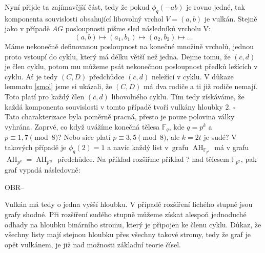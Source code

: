 \documentclass[12pt]{report}
\DeclareMathOperator{\AH}{AH}
\begin{document}


Nyní přijde ta zajímavější část, tedy že pokud $\phi_q(-ab)$ je rovno jedné, tak komponenta souvislosti obsahující libovolný vrchol $V=(a,b)$ je vulkán. Stejně jako v případě $AG$ posloupnosti pišme sled následníků vrcholu V:
$$(a,b)\longmapsto (a_1,b_1)\longmapsto (a_2, b_2) \longmapsto \dots$$
Máme nekonečně definovanou posloupnost na konečné množině vrcholů, jednou proto vstoupí do cyklu, který má délku větší než jedna. Dejme tomu, že $(c,d)$ je člen cyklu, potom mu můžeme psát nekonečnou posloupnost předků ležících v cyklu. Ať je tedy $(C,D)$ předchůdce $(c,d)$ neležící v cyklu.  V důkaze lemmatu \ref{smol} jsme si ukázali, že $(C,D)$ má dva rodiče a ti již rodiče nemají. Toto platí pro každý člen $(c,d)$ libovolného cyklu. Tím tedy získáváme, že každá komponenta souvislosti v tomto případě tvoří vulkány hloubky $2$. \hfill $\square$\\
 

Tato charakterizace byla poměrně pracná, přesto je pouze polovina války vyhrána. Zaprvé, co když uvážíme konečná tělesa $\mathbb{F}_q$, kde $q = p^k$ a $p \equiv 1,7 \pmod{8}$? Nebo sice platí $p \equiv 3,5 \pmod{8}$, ale $k = 2t$ je sudé? V takových případě je $\phi_q(2)=1$ a navíc každý list v~grafu $\AH_{\mathbb{F}_{p^t}}$ má v grafu $\AH_{p^k} = \AH_{p^{2t}}$ předchůdce. Na příklad rozšiřme příklad ? nad tělesem $\mathbb{F}_{p^2}$, pak graf vypadá následovně:

OBR--

Vulkán má tedy o jedna vyšší hloubku. V případě rozšíření lichého stupně jsou grafy shodné. Při rozšíření sudého stupně můžeme získat alespoň jednoduché odhady na hloubku binárního stromu, který je připojen ke členu cyklu. Důkaz, že všechny listy mají stejnou hloubku přes všechny takové stromy, tedy že graf je opět vulkánem, je již nad možnosti základní teorie čísel. 
\end{document}
